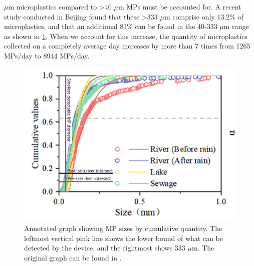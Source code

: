 \documentclass[fleqn,10pt]{SelfArx} %
\begin{document}
$\mu$m microplastics compared to \textgreater 40 $\mu$m MPs must be accounted for. A recent study conducted in Beijing found that these \textgreater 333 $\mu$m comprise only 13.2\% of microplastics, and that an additional 81\% can be found in the 40-333 $\mu$m range as shown in \ref{fig:PercentageSizes}. When we account for this increase, the quantity of microplastics collected on a completely average day increases by more than 7 times from 1265 MPs/day to 8944 MPs/day. 
	
	\begin{figure}[h]
		\centering
		\includegraphics[width=1\linewidth]{Figures/PercentDetectable1}
		\caption[Microplastic Size Distributions from 0-1 mm]{Annotated graph showing MP sizes by cumulative quantity. The leftmost vertical pink line shows the lower bound of what can be detected by the device, and the rightmost shows 333 $\mu$m. The original graph can be found in \cite{Niu_Xu_Wu_Gao_2024}.}
		\label{fig:PercentageSizes}
	\end{figure}
	
\end{document}
